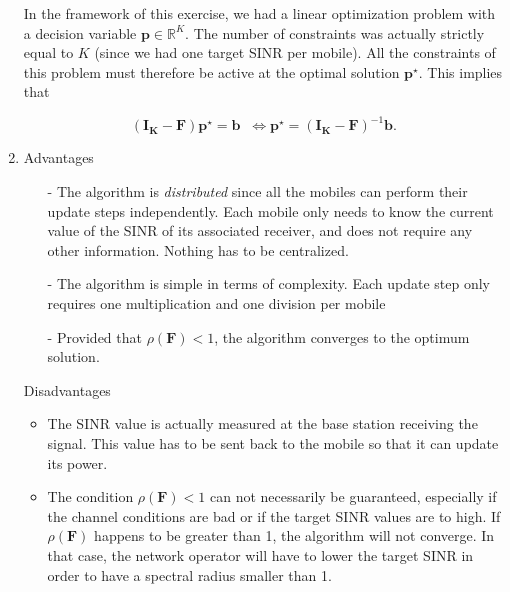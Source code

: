 \documentclass [a4paper, 11pt] {article}
\begin{document}
\begin{solution}
\begin{enumerate}
    In the framework of this exercise, we had a linear optimization problem with a decision variable $\mathbf{p} \in \mathbb{R}^K$. The number of constraints was actually strictly equal to $K$ (since we had one target SINR per mobile). All the constraints of this problem must therefore be active at the optimal solution $\mathbf{p}^\star$. This implies that

    \begin{equation}(\mathbf{I_K} - \mathbf{F})\mathbf{p}^\star = \mathbf{b} \; \; \Leftrightarrow \mathbf{p}^\star = (\mathbf{I_K} - \mathbf{F})^{-1} \mathbf{b}.
    \end{equation}



    \item Advantages

    \begin{itemize}
        \item[-] The algorithm is \textit{distributed} since all the mobiles can perform their update steps independently. Each mobile only needs to know the current value of the SINR of its associated receiver, and does not require any other information. Nothing has to be centralized.
        \item[-] The algorithm is simple in terms of complexity. Each update step only requires one multiplication and one division per mobile
        \item[-] Provided that $\rho(\mathbf{F})<1$, the algorithm converges to the optimum solution.
    \end{itemize}
    Disadvantages
    \begin{itemize}
        \item The SINR value is actually measured at the base station receiving the signal. This value has to be sent back to the mobile so that it can update its power.
        \item The condition $\rho(\mathbf{F})<1$ can not necessarily be guaranteed, especially if the channel conditions are bad or if the target SINR values are to high. If $\rho(\mathbf{F})$ happens to be greater than 1, the algorithm will not converge. In that case, the network operator will have to lower the target SINR in order to have a spectral radius smaller than 1.
    \end{itemize}
\end{enumerate}
    \end{solution}
\end{document}
